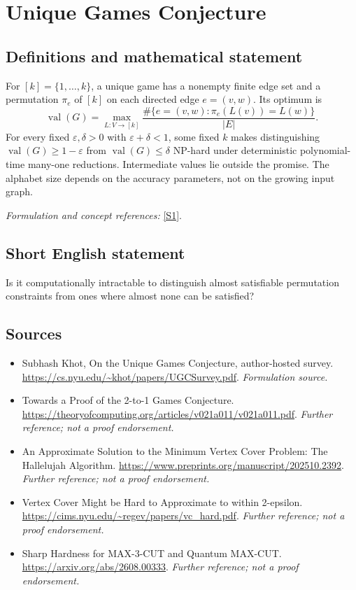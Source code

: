 \documentclass[11pt]{article}
\begin{document}
\section*{\texorpdfstring{Unique Games Conjecture}{Unique Games Conjecture}}\label{29}
\subsection{Definitions and mathematical statement}
For $[k]=\{1,\ldots,k\}$, a unique game has a nonempty finite edge set and a permutation $\pi_e$ of $[k]$ on each directed edge $e=(v,w)$. Its optimum is
\[
 \operatorname{val}(G)=\max_{L:V\to[k]}\frac{\#\{e=(v,w):\pi_e(L(v))=L(w)\}}{|E|}.
\]
For every fixed $\varepsilon,\delta>0$ with $\varepsilon+\delta<1$, some fixed $k$ makes distinguishing $\operatorname{val}(G)\ge1-\varepsilon$ from $\operatorname{val}(G)\le\delta$ NP-hard under deterministic polynomial-time many-one reductions. Intermediate values lie outside the promise. The alphabet size depends on the accuracy parameters, not on the growing input graph.
\par\smallskip\textit{Formulation and concept references:} \href{https://cs.nyu.edu/~khot/papers/UGCSurvey.pdf}{[S1]}.

\subsection{Short English statement}
Is it computationally intractable to distinguish almost satisfiable permutation constraints from ones where almost none can be satisfied?
\subsection{Sources}
\begin{itemize}
\item[S1]Subhash Khot, On the Unique Games Conjecture, author-hosted survey.
\url{https://cs.nyu.edu/~khot/papers/UGCSurvey.pdf}.
\textit{Formulation source.}
\item[S2]Towards a Proof of the 2-to-1 Games Conjecture.
\url{https://theoryofcomputing.org/articles/v021a011/v021a011.pdf}.
\textit{Further reference; not a proof endorsement.}
\item[S3]An Approximate Solution to the Minimum Vertex Cover Problem: The Hallelujah Algorithm.
\url{https://www.preprints.org/manuscript/202510.2392}.
\textit{Further reference; not a proof endorsement.}
\item[S4]Vertex Cover Might be Hard to Approximate to within 2-epsilon.
\url{https://cims.nyu.edu/~regev/papers/vc_hard.pdf}.
\textit{Further reference; not a proof endorsement.}
\item[S5]Sharp Hardness for MAX-3-CUT and Quantum MAX-CUT.
\url{https://arxiv.org/abs/2608.00333}.
\textit{Further reference; not a proof endorsement.}
\end{itemize}
\end{document}
